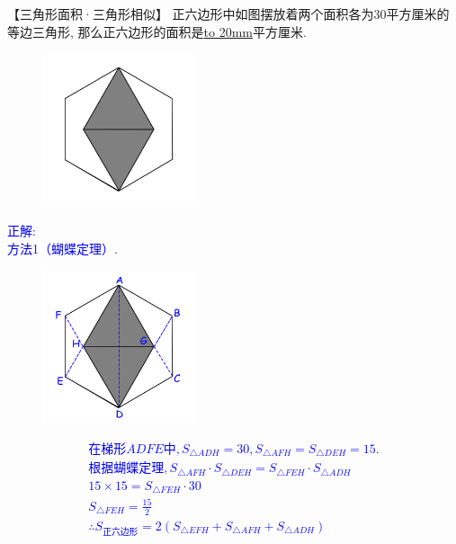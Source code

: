 \item {
    【三角形面积·三角形相似】
    正六边形中如图摆放着两个面积各为30平方厘米的等边三角形, 那么正六边形的面积是\underline{\hbox to 20mm{}}平方厘米.
    \begin{figure}[H] 
        \centering
        \includegraphics[width=0.4\textwidth]{./pics/Chapter_2/18.png}
    \end{figure}
    \ifshowSolution 
        \fangsong{}\textcolor{blue}{
            正解: \\
            方法1（蝴蝶定理）.\\
            \begin{figure}[H] 
                \centering
                \includegraphics[width=0.4\textwidth]{./pics/Chapter_2/seikai_18.png}
            \end{figure}
            \begin{gather*}
                在梯形ADFE中,S_{\triangle ADH}=30,
                S_{\triangle AFH} = S_{\triangle DEH} = 15. \\
                根据蝴蝶定理,S_{\triangle AFH} \cdot S_{\triangle DEH} = S_{\triangle FEH} \cdot S_{\triangle ADH}\\
                15 \times 15 = S_{\triangle FEH} \cdot 30\\
                S_{\triangle FEH} = \frac{15}{2}\\
                \therefore S_{正六边形} = 2(S_{\triangle EFH} + S_{\triangle AFH} + S_{\triangle ADH}) \\

\end{gather*}}}
